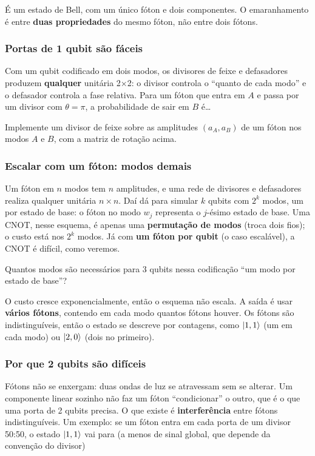 É um estado de Bell, com um único fóton e dois componentes. O emaranhamento é entre \textbf{duas propriedades} do mesmo fóton, não entre dois fótons.

\subsubsection{Portas de 1 qubit são fáceis}\label{portas-de-1-qubit-suxe3o-fuxe1ceis}

Com um qubit codificado em dois modos, os divisores de feixe e defasadores produzem \textbf{qualquer} unitária 2×2: o divisor controla o ``quanto de cada modo'' e o defasador controla a fase relativa. Para um fóton que entra em \(A\) e passa por um divisor com \(\theta = \pi\), a probabilidade de sair em \(B\) é\ldots{}

Implemente um divisor de feixe sobre as amplitudes \((a_A, a_B)\) de um fóton nos modos \(A\) e \(B\), com a matriz de rotação acima.

\subsubsection{Escalar com um fóton: modos demais}\label{escalar-com-um-fuxf3ton-modos-demais}

Um fóton em \(n\) modos tem \(n\) amplitudes, e uma rede de divisores e defasadores realiza qualquer unitária \(n\times n\). Daí dá para simular \(k\) qubits com \(2^k\) modos, um por estado de base: o fóton no modo \(w_j\) representa o \(j\)-ésimo estado de base. Uma CNOT, nesse esquema, é apenas uma \textbf{permutação de modos} (troca dois fios); o custo está nos \(2^k\) modos. Já com \textbf{um fóton por qubit} (o caso escalável), a CNOT é difícil, como veremos.

Quantos modos são necessários para 3 qubits nessa codificação ``um modo por estado de base''?

O custo cresce exponencialmente, então o esquema não escala. A saída é usar \textbf{vários fótons}, contendo em cada modo quantos fótons houver. Os fótons são indistinguíveis, então o estado se descreve por contagens, como \(\left|{1,1}\right>\) (um em cada modo) ou \(\left|{2,0}\right>\) (dois no primeiro).

\subsubsection{Por que 2 qubits são difíceis}\label{por-que-2-qubits-suxe3o-difuxedceis}

Fótons não se enxergam: duas ondas de luz se atravessam sem se alterar. Um componente linear sozinho não faz um fóton ``condicionar'' o outro, que é o que uma porta de 2 qubits precisa. O que existe é \textbf{interferência} entre fótons indistinguíveis. Um exemplo: se um fóton entra em cada porta de um divisor 50:50, o estado \(\left|{1,1}\right>\) vai para (a menos de sinal global, que depende da convenção do divisor)


